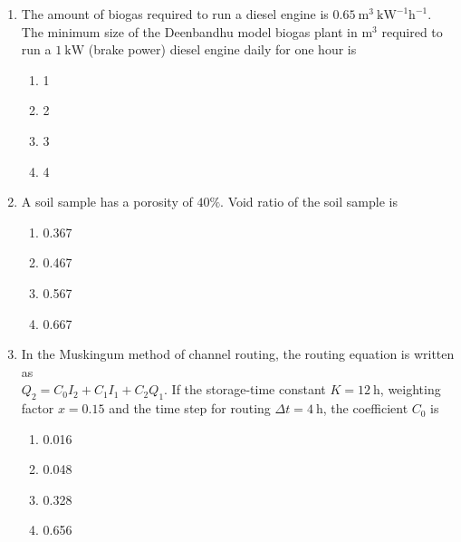 \documentclass[12pt]{article}
\begin{document}
\begin{enumerate}[label=Q.\arabic*]
		\item The amount of biogas required to run a diesel engine is $0.65\ \text{m}^3\ \text{kW}^{-1}\text{h}^{-1}$. The minimum size of the Deenbandhu model biogas plant in $\text{m}^3$ required to run a $1\ \text{kW}$ (brake power) diesel engine daily for one hour is
			\begin{multicols}{4}
				\begin{enumerate}[label=(\Alph*)]
					\item 1
					\item 2
					\item 3
					\item 4
				\end{enumerate}
			\end{multicols}
			\newpage
		\item A soil sample has a porosity of $40\%$. Void ratio of the soil sample is
			\begin{multicols}{4}
				\begin{enumerate}[label=(\Alph*)]
					\item 0.367
					\item 0.467
					\item 0.567
					\item 0.667
				\end{enumerate}
			\end{multicols}
		\item In the Muskingum method of channel routing, the routing equation is written as \\
			$Q_2 = C_0 I_2 + C_1 I_1 + C_2 Q_1$. If the storage-time constant $K = 12\ \text{h}$, weighting factor $x = 0.15$ and the time step for routing $\Delta t = 4\ \text{h}$, the coefficient $C_0$ is
			\begin{multicols}{4}
				\begin{enumerate}[label=(\Alph*)]
					\item 0.016
					\item 0.048
					\item 0.328
					\item 0.656
				\end{enumerate}
			\end{multicols}


\end{enumerate}
\end{document}
